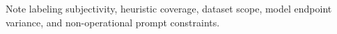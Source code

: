 Note labeling subjectivity, heuristic coverage, dataset scope, model endpoint variance, and non-operational prompt constraints.
